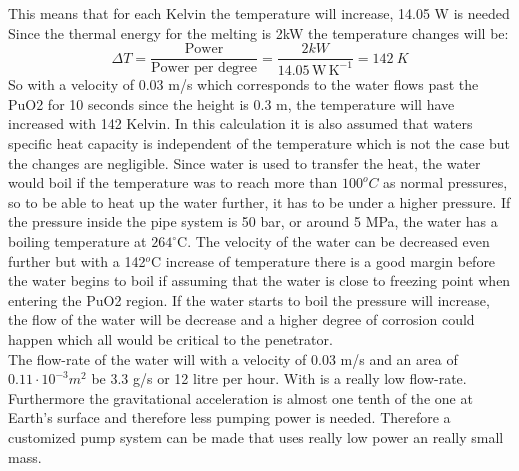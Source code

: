 This means that for each Kelvin the temperature will increase, 14.05 W is needed Since the thermal energy for the melting is 2kW the temperature changes will be: 
\begin{equation}\label{eq:waterheating2}
\Delta T = \frac{\text{Power}}{\text{Power per degree}} = \frac{2kW}{14.05 \, \mathrm{W \, K^{-1}}} = \SI{142}{K}
\end{equation}
So with a velocity of 0.03 m/s which corresponds to the water flows past the PuO2 for 10 seconds since the height is 0.3 m, the temperature will have increased with 142 Kelvin. In this calculation it is also assumed that waters specific heat capacity is independent of the temperature which is not the case but the changes are negligible. Since water is used to transfer the heat, the water would boil if the temperature was to reach more than $100^oC$ as normal pressures, so to be able to heat up the water further, it has to be under a higher pressure. If the pressure inside the pipe system is 50 bar, or around 5 MPa, the water has a boiling temperature at $264^\circ$C. The velocity of the water can be decreased even further but with a 142$^o$C increase of temperature there is a good margin before the water begins to boil if assuming that the water is close to freezing point when entering the PuO2 region. If the water starts to boil the pressure will increase, the flow of the water will be decrease and a higher degree of corrosion could happen which all would be critical to the penetrator. \\

\noindent
The flow-rate of the water will with a velocity of 0.03 m/s and an area of $0.11\cdot 10^{-3} m^2$ be 3.3 g/s or 12 litre per hour. With is a really low flow-rate. Furthermore the gravitational acceleration is almost one tenth of the one at Earth's surface and therefore less pumping power is needed. Therefore a customized pump system can be made that uses really low power an really small mass. 


